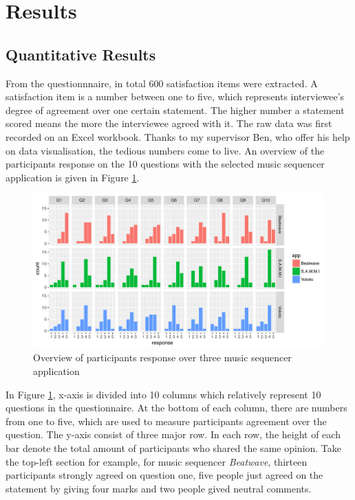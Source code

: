 \section{Results}

\subsection{Quantitative Results}
From the questionnnaire, in total 600 satisfaction items were extracted. A satisfaction item is a number between one to five, which represents interviewee's degree of agreement over one certain statement. The higher number a statement scored means the more the interviewee agreed with it. The raw data was first recorded on an Excel workbook. Thanks to my supervisor Ben, who offer his help on data visualisation, the tedious numbers come to live. An overview of the participants response on the 10 questions with the selected music sequencer application is given in Figure \ref{fig: questionnaire}.

\bigskip
\begin{figure}[h]
 \centering
 \includegraphics[width = \textwidth]{images/questionnaire-responses.pdf}
 \caption{Overview of participants response over three music sequencer application}
 \label{fig: questionnaire}
\end{figure}

In Figure \ref{fig: questionnaire}, x-axis is divided into 10 columns which relatively represent 10 questions in the questionnaire. At the bottom of each column, there are numbers from one to five, which are used to measure participants agreement over the question. The y-axis consist of three major row. In each row, the height of each bar denote the total amount of participants who shared the same opinion. Take the top-left section for example, for music sequencer \textit{Beatwave}, thirteen participants strongly agreed on question one, five people just agreed on the statement by giving four marks and two people gived neutral comments.

